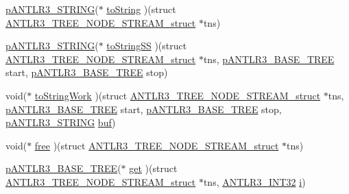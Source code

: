 \begin{DoxyCompactItemize}
\item 
\hyperlink{antlr3interfaces_8h_a36bbe7362079348864db4b4dbdcce56b}{p\-A\-N\-T\-L\-R3\-\_\-\-S\-T\-R\-I\-N\-G}($\ast$ \hyperlink{struct_a_n_t_l_r3___t_r_e_e___n_o_d_e___s_t_r_e_a_m__struct_a23ecc8ce37b51030490558a7b3cc4e44}{to\-String} )(struct \hyperlink{struct_a_n_t_l_r3___t_r_e_e___n_o_d_e___s_t_r_e_a_m__struct}{A\-N\-T\-L\-R3\-\_\-\-T\-R\-E\-E\-\_\-\-N\-O\-D\-E\-\_\-\-S\-T\-R\-E\-A\-M\-\_\-struct} $\ast$tns)
\item 
\hyperlink{antlr3interfaces_8h_a36bbe7362079348864db4b4dbdcce56b}{p\-A\-N\-T\-L\-R3\-\_\-\-S\-T\-R\-I\-N\-G}($\ast$ \hyperlink{struct_a_n_t_l_r3___t_r_e_e___n_o_d_e___s_t_r_e_a_m__struct_ae867da76a4f0fb0092ca2bbfe424ec56}{to\-String\-S\-S} )(struct \hyperlink{struct_a_n_t_l_r3___t_r_e_e___n_o_d_e___s_t_r_e_a_m__struct}{A\-N\-T\-L\-R3\-\_\-\-T\-R\-E\-E\-\_\-\-N\-O\-D\-E\-\_\-\-S\-T\-R\-E\-A\-M\-\_\-struct} $\ast$tns, \hyperlink{antlr3interfaces_8h_a6313a8a3e8f044398a393bd10c083852}{p\-A\-N\-T\-L\-R3\-\_\-\-B\-A\-S\-E\-\_\-\-T\-R\-E\-E} start, \hyperlink{antlr3interfaces_8h_a6313a8a3e8f044398a393bd10c083852}{p\-A\-N\-T\-L\-R3\-\_\-\-B\-A\-S\-E\-\_\-\-T\-R\-E\-E} stop)
\item 
void($\ast$ \hyperlink{struct_a_n_t_l_r3___t_r_e_e___n_o_d_e___s_t_r_e_a_m__struct_abd8afe607714bab5b88c99746f60e4c5}{to\-String\-Work} )(struct \hyperlink{struct_a_n_t_l_r3___t_r_e_e___n_o_d_e___s_t_r_e_a_m__struct}{A\-N\-T\-L\-R3\-\_\-\-T\-R\-E\-E\-\_\-\-N\-O\-D\-E\-\_\-\-S\-T\-R\-E\-A\-M\-\_\-struct} $\ast$tns, \hyperlink{antlr3interfaces_8h_a6313a8a3e8f044398a393bd10c083852}{p\-A\-N\-T\-L\-R3\-\_\-\-B\-A\-S\-E\-\_\-\-T\-R\-E\-E} start, \hyperlink{antlr3interfaces_8h_a6313a8a3e8f044398a393bd10c083852}{p\-A\-N\-T\-L\-R3\-\_\-\-B\-A\-S\-E\-\_\-\-T\-R\-E\-E} stop, \hyperlink{antlr3interfaces_8h_a36bbe7362079348864db4b4dbdcce56b}{p\-A\-N\-T\-L\-R3\-\_\-\-S\-T\-R\-I\-N\-G} \hyperlink{convert2cfg_8m_af30278de8dab4c8bc6e28657bdf50d14}{buf})
\item 
void($\ast$ \hyperlink{struct_a_n_t_l_r3___t_r_e_e___n_o_d_e___s_t_r_e_a_m__struct_a1a026ae809753b3db3f6ad689ead33af}{free} )(struct \hyperlink{struct_a_n_t_l_r3___t_r_e_e___n_o_d_e___s_t_r_e_a_m__struct}{A\-N\-T\-L\-R3\-\_\-\-T\-R\-E\-E\-\_\-\-N\-O\-D\-E\-\_\-\-S\-T\-R\-E\-A\-M\-\_\-struct} $\ast$tns)
\item 
\hyperlink{antlr3interfaces_8h_a6313a8a3e8f044398a393bd10c083852}{p\-A\-N\-T\-L\-R3\-\_\-\-B\-A\-S\-E\-\_\-\-T\-R\-E\-E}($\ast$ \hyperlink{struct_a_n_t_l_r3___t_r_e_e___n_o_d_e___s_t_r_e_a_m__struct_af29135ad561a2c7adc155c8c85e3536e}{get} )(struct \hyperlink{struct_a_n_t_l_r3___t_r_e_e___n_o_d_e___s_t_r_e_a_m__struct}{A\-N\-T\-L\-R3\-\_\-\-T\-R\-E\-E\-\_\-\-N\-O\-D\-E\-\_\-\-S\-T\-R\-E\-A\-M\-\_\-struct} $\ast$tns, \hyperlink{antlr3defs_8h_a6faef5c4687f8eb633d2aefea93973ca}{A\-N\-T\-L\-R3\-\_\-\-I\-N\-T32} \hyperlink{_read_d_m3___matlab_8m_a6f6ccfcf58b31cb6412107d9d5281426}{i})

\end{DoxyCompactItemize}

